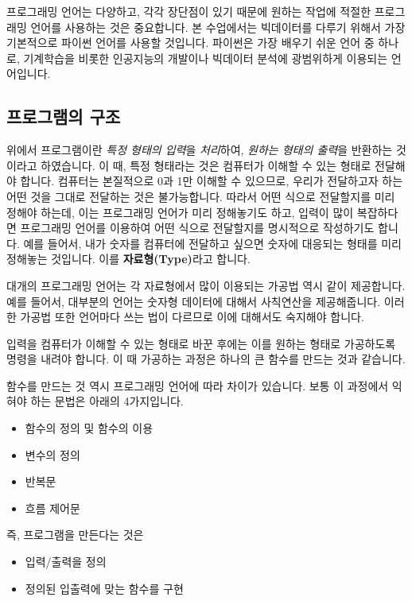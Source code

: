 \documentclass[twoside]{article}
\begin{document}
프로그래밍 언어는 다양하고, 각각 장단점이 있기 때문에 원하는 작업에 적절한 프로그래밍 언어를 사용하는 것은 중요합니다. 본 수업에서는 빅데이터를 다루기 위해서 가장 기본적으로 파이썬 언어를 사용할 것입니다. 파이썬은 가장 배우기 쉬운 언어 중 하나로, 기계학습을 비롯한 인공지능의 개발이나 빅데이터 분석에 광범위하게 이용되는 언어입니다. 

\subsection{프로그램의 구조} 

위에서 프로그램이란 \textit{특정 형태의 입력}을 \textit{처리}하여, \textit{원하는 형태의 출력}을 반환하는 것이라고 하였습니다. 이 때, 특정 형태라는 것은 컴퓨터가 이해할 수 있는 형태로 전달해야 합니다. 컴퓨터는 본질적으로 0과 1만 이해할 수 있으므로, 우리가 전달하고자 하는 어떤 것을 그대로 전달하는 것은 불가능합니다. 따라서 어떤 식으로 전달할지를 미리 정해야 하는데, 이는 프로그래밍 언어가 미리 정해놓기도 하고, 입력이 많이 복잡하다면 프로그래밍 언어를 이용하여 어떤 식으로 전달할지를 명시적으로 작성하기도 합니다. 예를 들어서, 내가 숫자를 컴퓨터에 전달하고 싶으면 숫자에 대응되는 형태를 미리 정해놓는 것입니다. 이를 \textbf{자료형(Type)}라고 합니다.

대개의 프로그래밍 언어는 각 자료형에서 많이 이용되는 가공법 역시 같이 제공합니다. 예를 들어서, 대부분의 언어는 숫자형 데이터에 대해서 사칙연산을 제공해줍니다. 이러한 가공법 또한 언어마다 쓰는 법이 다르므로 이에 대해서도 숙지해야 합니다. 

입력을 컴퓨터가 이해할 수 있는 형태로 바꾼 후에는 이를 원하는 형태로 가공하도록 명령을 내려야 합니다. 이 때 가공하는 과정은 하나의 큰 함수를 만드는 것과 같습니다. 


함수를 만드는 것 역시 프로그래밍 언어에 따라 차이가 있습니다. 보통 이 과정에서 익혀야 하는 문법은 아래의 4가지입니다. 

\begin{itemize} 
\item 함수의 정의 및 함수의 이용 
\item 변수의 정의 
\item 반복문 
\item 흐름 제어문 
\end{itemize}

즉, 프로그램을 만든다는 것은 
\begin{itemize} 
\item 입력/출력을 정의 
\item 정의된 입출력에 맞는 함수를 구현
\end{itemize}
\end{document}
